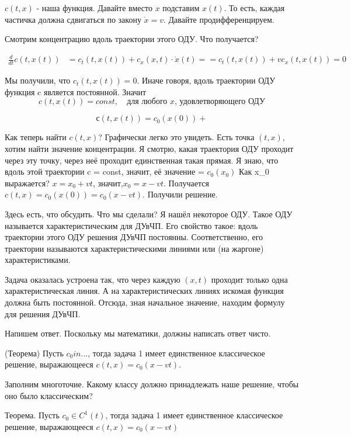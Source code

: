 $c (t, x)$ - наша функция. Давайте вместо $x$ подставим $ x(t) $. То есть, каждая частичка должна сдвигаться по закону $\dot x = v$. Давайте продифференцируем.

Смотрим концентрацию вдоль траектории этого ОДУ. Что получается?

\begin{align*}
    \frac {d} {dt} c (t, x(t)) & = c_t (t, x(t)) + c_x (x, t) \cdot \dot x (t) = = c_t (t, x(t)) + v c_x (t, x(t)) = 0
\end{align*}

Мы получили, что $ c_t (t,x(t)) = 0 $. Иначе говоря, вдоль траектории ОДУ функция c является постоянной.
Значит
$$ c(t,x(t)) = const,\quad \text{для любого } x \text{, удовлетворяющего ОДУ}$$

$$с(t,x(t)) = c_0(x(0)) + $$

Как теперь найти $c(t,x)$? Графически легко это увидеть.
Есть точка $(t,x)$, хотим найти значение концентрации. Я смотрю, какая траектория ОДУ проходит через эту точку, через неё проходит единственная такая прямая. Я знаю, что вдоль этой траектории c = const, значит, её значение = $c_0(x_0)$
Как x_0 выражается? $x = x_0 + vt$, значит,$ x_0 = x - vt$.
Получается $c(t,x) = c_0(x(0)) = c_0(x-vt)$. Получили решение.

Здесь есть, что обсудить. Что мы сделали? Я нашёл некоторое ОДУ. Такое ОДУ называется характеристическим для ДУвЧП. Его свойство такое: вдоль траектории этого ОДУ решения ДУвЧП постоянны. Соответственно, его траектории называются характеристическими линиями или (на жаргоне) характеристиками.

Задача оказалась устроена так, что через каждую $(x,t)$ проходит только одна характеристическая линия. А на характеристических линиях искомая функция должна быть постоянной. Отсюда, зная начальное значение, находим формулу для решения ДУвЧП.

Напишем ответ. Поскольку мы математики, должны написать ответ чисто.

\begin{note} (Теорема) Пусть $c_0 in ...$, тогда задача 1 имеет единственное классическое решение, выражающееся $c(t,x) = c_0(x - vt)$.
\end{note}
Заполним многоточие. Какому классу должно принадлежать наше решение, чтобы оно было классическим? 

\begin{theorem}
Теорема. Пусть $c_0 \in C^1(t)$, тогда задача 1 имеет единственное классическое решение, выражающееся $c(t,x) = c_0(x - vt)$
\end{theorem}

